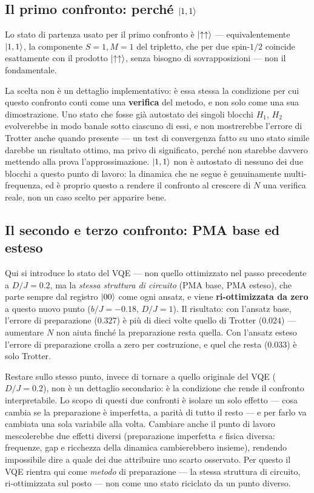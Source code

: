 \documentclass[11pt,a4paper]{article}
\begin{document}
\subsection*{Il primo confronto: perché $\lvert 1,1\rangle$}

Lo stato di partenza usato per il primo confronto è $\lvert \uparrow\uparrow\rangle$
--- equivalentemente $\lvert 1,1\rangle$, la componente $S{=}1,M{=}1$ del
tripletto, che per due spin-$1/2$ coincide esattamente con il prodotto
$\lvert \uparrow\uparrow\rangle$, senza bisogno di sovrapposizioni --- non il
fondamentale.

La scelta non è un dettaglio implementativo: è essa stessa la condizione
per cui questo confronto conti come una \textbf{verifica} del metodo, e
non solo come una sua dimostrazione. Uno stato che fosse già autostato dei
singoli blocchi $H_1$, $H_2$ evolverebbe in modo banale sotto ciascuno di
essi, e non mostrerebbe l'errore di Trotter anche quando presente --- un
test di convergenza fatto su uno stato simile darebbe un risultato ottimo,
ma privo di significato, perché non starebbe davvero mettendo alla prova
l'approssimazione. $\lvert 1,1\rangle$ non è autostato di nessuno dei due blocchi a
questo punto di lavoro: la dinamica che ne segue è genuinamente
multi-frequenza, ed è proprio questo a rendere il confronto al crescere di
$N$ una verifica reale, non un caso scelto per apparire bene.

\subsection*{Il secondo e terzo confronto: PMA base ed esteso}

Qui si introduce lo stato del VQE --- non quello ottimizzato nel passo
precedente a $D/J=0.2$, ma la \emph{stessa struttura di circuito} (PMA
base, PMA esteso), che parte sempre dal registro $\lvert 00\rangle$ come ogni ansatz, e
viene \textbf{ri-ottimizzata da zero} a questo nuovo punto ($b/J=-0.18$,
$D/J=1$). Il risultato: con l'ansatz base, l'errore di preparazione
($0.327$) è più di dieci volte quello di Trotter ($0.024$) --- aumentare
$N$ non aiuta finché la preparazione resta quella. Con l'ansatz esteso
l'errore di preparazione crolla a zero per costruzione, e quel che resta
($0.033$) è solo Trotter.

Restare sullo stesso punto, invece di tornare a quello originale del VQE
($D/J=0.2$), non è un dettaglio secondario: è la condizione che rende il
confronto interpretabile. Lo scopo di questi due confronti è isolare un
solo effetto --- cosa cambia se la preparazione è imperfetta, a parità di
tutto il resto --- e per farlo va cambiata una sola variabile alla volta.
Cambiare anche il punto di lavoro mescolerebbe due effetti diversi
(preparazione imperfetta \emph{e} fisica diversa: frequenze, gap e
ricchezza della dinamica cambierebbero insieme), rendendo impossibile
dire a quale dei due attribuire uno scarto osservato. Per questo il VQE
rientra qui come \emph{metodo} di preparazione --- la stessa struttura di
circuito, ri-ottimizzata sul posto --- non come uno stato riciclato da
un punto diverso.
\end{document}

